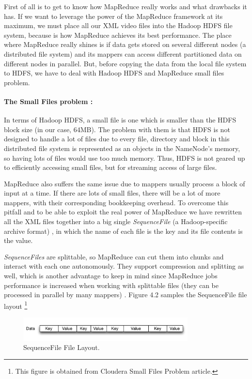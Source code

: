 First of all is to get to know how MapReduce really works and what drawbacks it has. If we want to leverage the power of the MapReduce framework at its maximum, we must place all our XML video files into the Hadoop HDFS file system, because is how MapReduce achieves its best performance. The place where MapReduce really shines is if data gets stored on several different nodes (a distributed file system) and its mappers can access different partitioned data on different nodes in parallel. But, before copying the data from the local file system to HDFS, we have to deal with Hadoop HDFS and MapReduce small files problem.

\paragraph{The Small Files problem \cite{liu2009implementing}:} In terms of Hadoop HDFS, a small file is one which is smaller than the HDFS block size (in our case, 64MB). The problem with them is that HDFS is not designed to handle a lot of files due to every file, directory and block in this distributed file system is represented as an objects in the NameNode's memory, so having lots of files would use too much memory. Thus, HDFS is not geared up to efficiently accessing small files, but for streaming access of large files. 
\par
MapReduce also suffers the same issue due to mappers usually process a block of input at a time. If there are lots of small files, there will be a lot of more mappers, with their corresponding bookkeeping overhead. To overcome this pitfall and to be able to exploit the real power of MapReduce we have rewritten all the XML files together into a big single \textit{SequenceFile} (a Hadoop-specific archive format) \cite{ApacheHadoopSequenceFile}, in which the name of each file is the key and its file contents is the value. 
\par
\textit{SequenceFiles} are splittable, so MapReduce can cut them into chunks and interact with each one autonomously. They support compression and splitting as well, which is another advantage to keep in mind since MapReduce jobs performance is increased when working with splittable files (they can be processed in parallel by many mappers)  \cite{SmallFiles}. Figure 4.2 samples the SequenceFile file layout \footnote{This figure is obtained from Cloudera Small Files Problem article.}

\begin{figure}[htb]
\centering
\includegraphics[width=0.8\textwidth]{./images/sequencefile.png}
\caption{SequenceFile File Layout.} \label{fig:sequencefile}
\end{figure}


